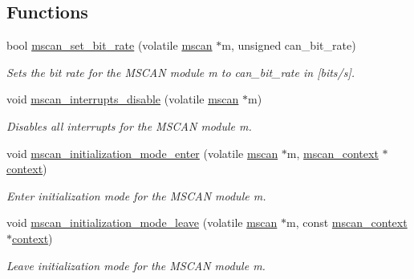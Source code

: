 \subsection*{Functions}
\begin{DoxyCompactItemize}
\item 
bool \mbox{\hyperlink{group__RTEMSBSPsPowerPCGen5200MSCAN_gab0041bb347543a53b2f8bcde1cc6a586}{mscan\+\_\+set\+\_\+bit\+\_\+rate}} (volatile \mbox{\hyperlink{group__RTEMSBSPsPowerPCGen5200MSCAN_gacfd56a4a482c5e7da2cff003284b2d51}{mscan}} $\ast$m, unsigned can\+\_\+bit\+\_\+rate)
\begin{DoxyCompactList}\small\item\em Sets the bit rate for the M\+S\+C\+AN module {\itshape m} to {\itshape can\+\_\+bit\+\_\+rate} in \mbox{[}bits/s\mbox{]}. \end{DoxyCompactList}\item 
void \mbox{\hyperlink{group__RTEMSBSPsPowerPCGen5200MSCAN_gad41e407b85565ec829d2d47f3ae874a2}{mscan\+\_\+interrupts\+\_\+disable}} (volatile \mbox{\hyperlink{group__RTEMSBSPsPowerPCGen5200MSCAN_gacfd56a4a482c5e7da2cff003284b2d51}{mscan}} $\ast$m)
\begin{DoxyCompactList}\small\item\em Disables all interrupts for the M\+S\+C\+AN module {\itshape m}. \end{DoxyCompactList}\item 
void \mbox{\hyperlink{group__RTEMSBSPsPowerPCGen5200MSCAN_ga587e0d7b0c1d090fda013c551f02a3f7}{mscan\+\_\+initialization\+\_\+mode\+\_\+enter}} (volatile \mbox{\hyperlink{group__RTEMSBSPsPowerPCGen5200MSCAN_gacfd56a4a482c5e7da2cff003284b2d51}{mscan}} $\ast$m, \mbox{\hyperlink{structmscan__context}{mscan\+\_\+context}} $\ast$\mbox{\hyperlink{sun4u_2tte_8h_a9b4a99475e2709333b8e5d70483173f1}{context}})
\begin{DoxyCompactList}\small\item\em Enter initialization mode for the M\+S\+C\+AN module {\itshape m}. \end{DoxyCompactList}\item 
void \mbox{\hyperlink{group__RTEMSBSPsPowerPCGen5200MSCAN_ga29478727b755ce8d81ded34969194a1b}{mscan\+\_\+initialization\+\_\+mode\+\_\+leave}} (volatile \mbox{\hyperlink{group__RTEMSBSPsPowerPCGen5200MSCAN_gacfd56a4a482c5e7da2cff003284b2d51}{mscan}} $\ast$m, const \mbox{\hyperlink{structmscan__context}{mscan\+\_\+context}} $\ast$\mbox{\hyperlink{sun4u_2tte_8h_a9b4a99475e2709333b8e5d70483173f1}{context}})
\begin{DoxyCompactList}\small\item\em Leave initialization mode for the M\+S\+C\+AN module {\itshape m}. \end{DoxyCompactList}\item 

\end{DoxyCompactItemize}
